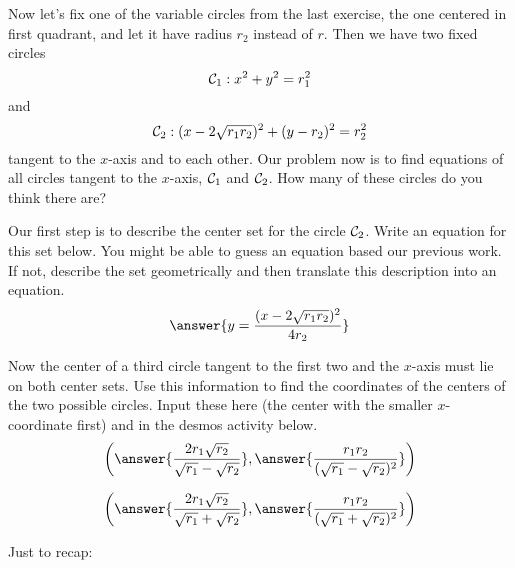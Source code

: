 \documentclass{ximera}
\begin{document}
\begin{exploration}   \label{Ex2434634:Spheres}
Now let's fix one of the variable circles from the last exercise, the one centered in first quadrant, and let it have radius $r_2$ instead of $r$. Then we have two fixed circles
\[
   {\cal C}_1: x^2 + y^2 = r_1^2
\]
and
\[
  {\cal C}_2:  (x-2\sqrt{r_1r_2})^2 + (y-r_2)^2 = r_2^2
\]
tangent to the $x$-axis and to each other. Our problem now is to find equations of all circles tangent to the $x$-axis, ${\cal C}_1$ and ${\cal C}_2$. How many of these circles do you think there are?


Our first step is to describe the center set for the circle ${\cal C}_2$. Write an equation for this set below. You might be able to guess an equation based our previous work. If not, describe the set geometrically and then translate this description into an equation. 
\[
    \answer{y=\frac{(x-2\sqrt{r_1r_2})^2}{4r_2}}
\]

Now the center of a third circle tangent to the first two and the $x$-axis must lie on both center sets. Use this information to find the coordinates of the centers of the two possible circles. Input these here (the center with the smaller $x$-coordinate first) and in the desmos activity below.
\[
   \left( \answer{\frac{2r_1\sqrt{r_2}}{\sqrt{r_1} -\sqrt{r_2}}} , \answer{\frac{r_1 r_2}{(\sqrt{r_1} -\sqrt{r_2})^2}}  \right) 
\]

\[
   \left( \answer{\frac{2r_1\sqrt{r_2}}{\sqrt{r_1} +\sqrt{r_2}}} , \answer{\frac{r_1 r_2}{(\sqrt{r_1} +\sqrt{r_2})^2}}  \right) 
\]


 
\begin{onlineOnly}
    \begin{center}
\end{center}
\end{onlineOnly}
\end{exploration}

Just to recap:
\end{document}
